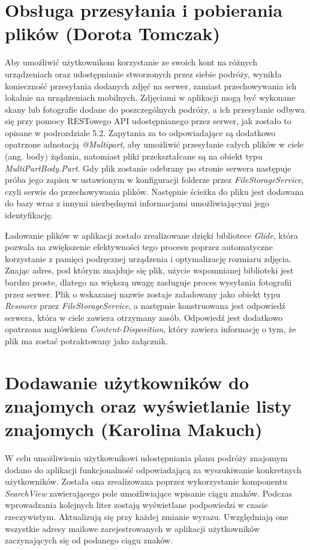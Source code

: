 \documentclass[10pt,twoside,a4paper]{report}
\begin{document}
\section{Obsługa przesyłania i pobierania plików (Dorota Tomczak)}
\par Aby umożliwić użytkownikom korzystanie ze swoich kont na różnych urządzeniach oraz udostępnianie stworzonych przez siebie podróży, wynikła konieczność przesyłania dodanych zdjęć na serwer, zamiast przechowywania ich lokalnie na urządzeniach mobilnych. Zdjęciami w aplikacji mogą być wykonane skany lub fotografie dodane do poszczególnych podróży, a ich przesyłanie odbywa się przy pomocy RESTowego API udostępnianego przez serwer, jak zostało to opisane w podrozdziale 5.2. Zapytania za to odpowiadające są dodatkowo opatrzone adnotacją \textit{@Multipart}, aby umożliwić przesyłanie całych plików w ciele (ang. body) żądania, natomiast pliki przekształcane są na obiekt typu \textit{MultiPartBody.Part}. Gdy plik zostanie odebrany po stronie serwera następuje próba jego zapisu w ustawionym w konfiguracji folderze przez \textit{FileStorageService}, czyli serwis do przechowywania plików. Następnie ścieżka do pliku jest dodawana do bazy wraz z innymi niezbędnymi informacjami umożliwiającymi jego identyfikację.

\par Ładowanie plików w aplikacji zostało zrealizowane dzięki bibliotece \textit{Glide}\cite{Glide}, która pozwala na zwiększenie efektywności tego procesu poprzez automatyczne korzystanie z pamięci podręcznej urządzenia i optymalizację rozmiaru zdjęcia. Znając adres, pod którym znajduje się plik, użycie wspomnianej biblioteki jest bardzo proste, dlatego na większą uwagę zasługuje proces wysyłania fotografii przez serwer. Plik o wskazanej nazwie zostaje załadowany jako obiekt typu \textit{Resource} przez \textit{FileStorageService}, a następnie konstruowana jest odpowiedź serwera, która w ciele zawiera otrzymany zasób. Odpowiedź jest dodatkowo opatrzona nagłówkiem \textit{Content-Disposition}, który zawiera informację o tym, że plik ma zostać potraktowany jako załącznik. 

\section{Dodawanie użytkowników do znajomych oraz wyświetlanie listy znajomych (Karolina Makuch)}

\par W celu umożliwienia użytkownikowi udostępniania planu podróży znajomym dodano do aplikacji funkcjonalność odpowiadającą za wyszukiwanie konkretnych użytkowników. Została ona zrealizowana poprzez  wykorzystanie komponentu \textit{SearchView} \cite{SearchView} zawierającego pole umożliwiające wpisanie ciągu znaków. Podczas wprowadzania kolejnych liter zostają wyświetlane podpowiedzi w czasie rzeczywistym. Aktualizują się  przy każdej zmianie wyrazu. Uwzględniają one wszystkie adresy mailowe zarejestrowanych w aplikacji użytkowników zaczynających się od podanego ciągu znaków.
\end{document}
